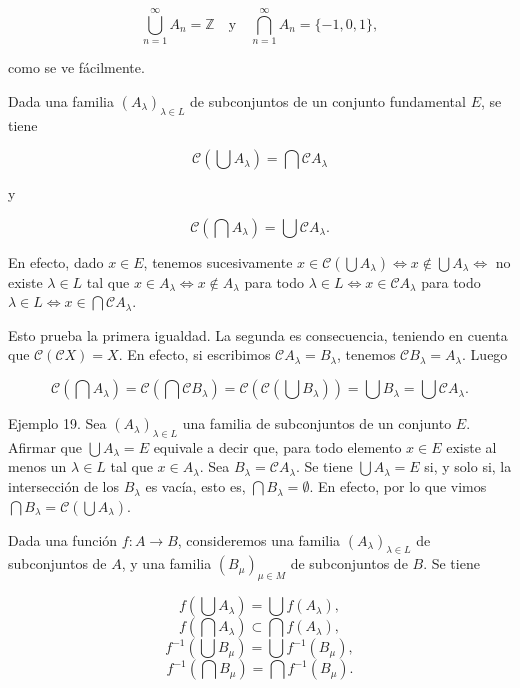 \[
\bigcup_{n=1}^\infty A_n = \mathbb{Z} \quad \text{y} \quad \bigcap_{n=1}^\infty A_n = \{-1, 0, 1\},
\]

como se ve fácilmente.

Dada una familia \((A_\lambda)_{\lambda \in L}\) de subconjuntos de un conjunto fundamental \(E\), se tiene

\[
\mathcal{C}\left(\bigcup A_\lambda\right) = \bigcap \mathcal{C} A_\lambda
\]

y

\[
\mathcal{C}\left(\bigcap A_\lambda\right) = \bigcup \mathcal{C} A_\lambda.
\]

En efecto, dado \(x \in E\), tenemos sucesivamente \(x \in \mathcal{C}(\bigcup A_\lambda) \iff x \notin \bigcup A_\lambda \iff\) no existe \(\lambda \in L\) tal que \(x \in A_\lambda \iff x \notin A_\lambda\) para todo \(\lambda \in L \iff x \in \mathcal{C} A_\lambda\) para todo \(\lambda \in L \iff x \in \bigcap \mathcal{C} A_\lambda\).

Esto prueba la primera igualdad. La segunda es consecuencia, teniendo en cuenta que \(\mathcal{C}(\mathcal{C}X) = X\). En efecto, si escribimos \(\mathcal{C} A_\lambda = B_\lambda\), tenemos \(\mathcal{C} B_\lambda = A_\lambda\). Luego

\[
\mathcal{C}\left(\bigcap A_\lambda\right) = \mathcal{C}\left(\bigcap \mathcal{C} B_\lambda\right) = \mathcal{C}\left(\mathcal{C}\left(\bigcup B_\lambda\right)\right) = \bigcup B_\lambda = \bigcup \mathcal{C} A_\lambda.
\]

Ejemplo 19. Sea \((A_\lambda)_{\lambda \in L}\) una familia de subconjuntos de un conjunto \(E\). Afirmar que \(\bigcup A_\lambda = E\) equivale a decir que, para todo elemento \(x \in E\) existe al menos un \(\lambda \in L\) tal que \(x \in A_\lambda\). Sea \(B_\lambda = \mathcal{C} A_\lambda\). Se tiene \(\bigcup A_\lambda = E\) si, y solo si, la intersección de los \(B_\lambda\) es vacía, esto es, \(\bigcap B_\lambda = \emptyset\). En efecto, por lo que vimos \(\bigcap B_\lambda = \mathcal{C}(\bigcup A_\lambda)\).

Dada una función \(f: A \to B\), consideremos una familia \((A_\lambda)_{\lambda \in L}\) de subconjuntos de \(A\), y una familia \((B_\mu)_{\mu \in M}\) de subconjuntos de \(B\). Se tiene

\[
f\left(\bigcup A_\lambda\right) = \bigcup f(A_\lambda),
\]
\[
f\left(\bigcap A_\lambda\right) \subset \bigcap f(A_\lambda),
\]
\[
f^{-1}\left(\bigcup B_\mu\right) = \bigcup f^{-1}(B_\mu),
\]
\[
f^{-1}\left(\bigcap B_\mu\right) = \bigcap f^{-1}(B_\mu).
\]

